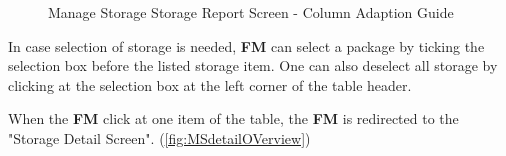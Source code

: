 \begin{figure}[H] %
	\centering
    \hspace{5pt}
    
    \vspace{10pt}
    \caption{Manage Storage Storage Report Screen - Column Adaption Guide}
	\label{fig:MSstorageReportColumnAdaption}
\end{figure}

In case selection of storage is needed, \textbf{FM} can select a package by ticking the selection box before the listed storage item. One can also deselect all storage by clicking at the selection box at the left corner of the table header.

\bigskip

When the \textbf{FM} click at one item of the table, the \textbf{FM} is redirected to the "Storage Detail Screen".
(\autoref{fig:MSdetailOVerview})

